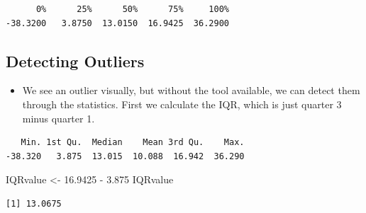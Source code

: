 \documentclass[
  letterpaper,
  DIV=11,
  numbers=noendperiod]{scrreprt}
\newenvironment{Shaded}{\begin{snugshade}}{\end{snugshade}}
\newcommand{\FloatTok}[1]{\textcolor[rgb]{0.68,0.00,0.00}{#1}}
\newcommand{\FunctionTok}[1]{\textcolor[rgb]{0.28,0.35,0.67}{#1}}
\newcommand{\NormalTok}[1]{\textcolor[rgb]{0.00,0.23,0.31}{#1}}
\newcommand{\OtherTok}[1]{\textcolor[rgb]{0.00,0.23,0.31}{#1}}
\newcommand{\SpecialCharTok}[1]{\textcolor[rgb]{0.37,0.37,0.37}{#1}}
\providecommand{\tightlist}{%
  \setlength{\itemsep}{0pt}\setlength{\parskip}{0pt}}\usepackage{longtable,booktabs,array}
\begin{document}
\begin{Shaded}
\end{Shaded}

\begin{verbatim}
      0%      25%      50%      75%     100% 
-38.3200   3.8750  13.0150  16.9425  36.2900 
\end{verbatim}

\subsection{Detecting Outliers}\label{detecting-outliers}

\begin{itemize}
\tightlist
\item
  We see an outlier visually, but without the tool available, we can
  detect them through the statistics. First we calculate the IQR, which
  is just quarter 3 minus quarter 1.
\end{itemize}

\begin{Shaded}
\end{Shaded}

\begin{verbatim}
   Min. 1st Qu.  Median    Mean 3rd Qu.    Max. 
-38.320   3.875  13.015  10.088  16.942  36.290 
\end{verbatim}

\begin{Shaded}
\begin{Highlighting}[]
\NormalTok{IQRvalue }\OtherTok{\textless{}{-}} \FloatTok{16.9425} \SpecialCharTok{{-}} \FloatTok{3.875}
\NormalTok{IQRvalue}
\end{Highlighting}
\end{Shaded}

\begin{verbatim}
[1] 13.0675
\end{verbatim}

\begin{Shaded}
\end{Shaded}
\end{document}
